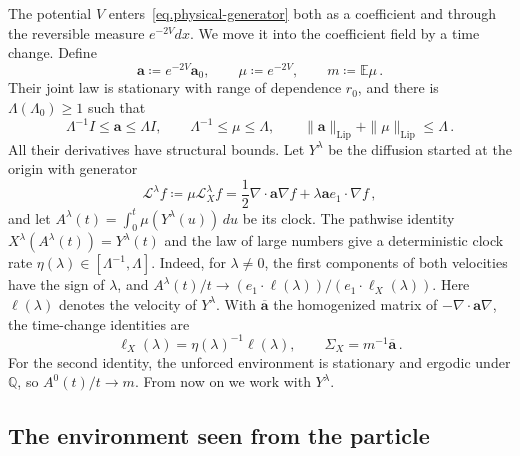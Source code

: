 \documentclass[11pt]{amsart}
\theoremstyle{definition}
\theoremstyle{remark}
\numberwithin{equation}{section}
\newcommand{\E}{\mathbb E}
\newcommand{\Q}{\mathbb Q}
\renewcommand{\a}{\mathbf a}
\newcommand{\ahom}{\overline{\mathbf a}}
\begin{document}
The potential $V$ enters~\eqref{eq.physical-generator} both as a coefficient and through the reversible measure $e^{-2V}dx$. We move it into the coefficient field by a time change. Define
\begin{equation}\label{eq.reduced-fields}
 \a\coloneqq e^{-2V}\a_0,\qquad \mu\coloneqq e^{-2V},\qquad m\coloneqq\E\mu\, .
\end{equation}
Their joint law is stationary with range of dependence $r_0$, and there is $\Lambda(\Lambda_0)\geq1$ such that
\begin{equation}\label{eq.reduced-bounds}
 \Lambda^{-1}I\leq\a\leq\Lambda I,\qquad
 \Lambda^{-1}\leq\mu\leq\Lambda,\qquad
 \|\a\|_{\mathrm{Lip}}+\|\mu\|_{\mathrm{Lip}}\leq\Lambda\, .
\end{equation}
All their derivatives have structural bounds. Let $Y^\lambda$ be the diffusion started at the origin with generator
\begin{equation}\label{eq.reduced-generator}
 \mathcal L^\lambda f\coloneqq\mu\mathcal L_X^\lambda f
 =\frac12\nabla\cdot\a\nabla f+\lambda\a e_1\cdot\nabla f\, ,
\end{equation}
and let $A^\lambda(t)=\int_0^t\mu(Y^\lambda(u))\,du$ be its clock. The pathwise identity $X^\lambda(A^\lambda(t))=Y^\lambda(t)$ and the law of large numbers give a deterministic clock rate $\eta(\lambda)\in[\Lambda^{-1},\Lambda]$. Indeed, for $\lambda\neq0$, the first components of both velocities have the sign of $\lambda$, and $A^\lambda(t)/t\to(e_1\cdot\ell(\lambda))/(e_1\cdot\ell_X(\lambda))$. Here $\ell(\lambda)$ denotes the velocity of $Y^\lambda$. With $\ahom$ the homogenized matrix of $-\nabla\cdot\a\nabla$, the time-change identities are
\begin{equation}\label{eq.time-change-identities}
 \ell_X(\lambda)=\eta(\lambda)^{-1}\ell(\lambda),\qquad
 \Sigma_X=m^{-1}\ahom\, .
\end{equation}
For the second identity, the unforced environment is stationary and ergodic under $\Q$, so $A^0(t)/t\to m$. From now on we work with $Y^\lambda$.

\subsection{The environment seen from the particle}\label{ss.environment}
\end{document}
